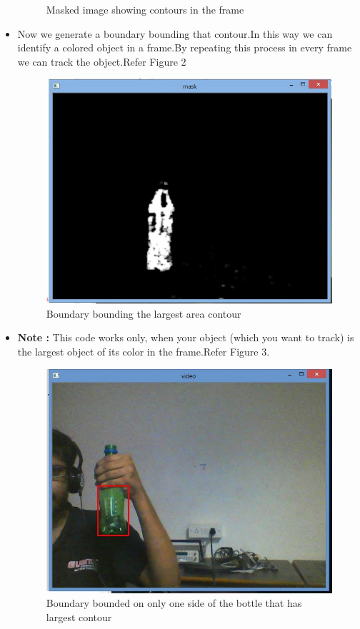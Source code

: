\documentclass[11pt,a4paper]{article}
\begin{document}
\begin{itemize}
\begin{figure}[h!]
		\centering
		\caption{Masked image showing contours in the frame}
		\end{figure}
		\item Now we generate a boundary bounding that contour.In this way we can identify a colored object in a frame.By repeating this process in every frame we can track the object.Refer Figure 2		
		\begin{figure}[h]
		\includegraphics[scale=0.4]{Capture2.jpg}	
		\centering
		\caption{Boundary bounding the largest area contour}
		\end{figure}
		\item \textbf{Note :} This code works only, when your object (which you want to track) is the largest object of its color in the frame.Refer Figure 3.
		\begin{figure}[h!]
		\includegraphics[scale=0.4]{Capture3.jpg}	
		\centering
		\caption{Boundary bounded on only one side of the bottle that has largest contour}
		\end{figure}
	\end{itemize}
	\newpage
\end{document}
